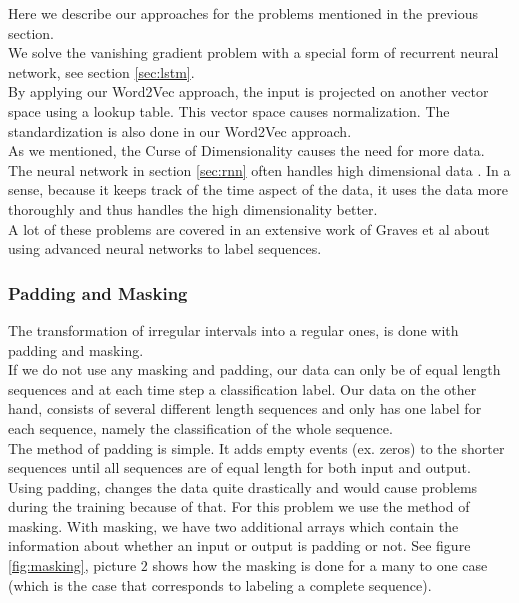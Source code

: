 Here we describe our approaches for the problems mentioned in the previous section. \\
We solve the vanishing gradient problem with a special form of recurrent neural network, see section \ref{sec:lstm}. \\
By applying our Word2Vec approach, the input is projected on another vector space using a lookup table. This vector space causes normalization. The standardization is also done in our Word2Vec approach. \\
As we mentioned, the Curse of Dimensionality causes the need for more data. The neural network in section \ref{sec:rnn} often handles high dimensional data \cite{nn1:article} \cite{nn2:article} \cite{nn3:article} \cite{nn4:article}. In a sense, because it keeps track of the time aspect of the data, it uses the data more thoroughly and thus handles the high dimensionality better. \\

A lot of these problems are covered in an extensive work of Graves et al \cite{gravesLstm:thesis} about using advanced neural networks to label sequences.

\subsubsection{Padding and Masking}
The transformation of irregular intervals into a regular ones, is done with padding and masking. \\

If we do not use any masking and padding, our data can only be of equal length sequences and at each time step a classification label. Our data on the other hand, consists of several different length sequences and only has one label for each sequence, namely the classification of the whole sequence. \\

The method of padding is simple. It adds empty events (ex. zeros) to the shorter sequences until all sequences are of equal length for both input and output. \\
Using padding, changes the data quite drastically and would cause problems during the training because of that. For this problem we use the method of masking. With masking, we have two additional arrays which contain the information about whether an input or output is padding or not. See figure \ref{fig:masking}, picture $2$ shows how the masking is done for a many to one case (which is the case that corresponds to labeling a complete sequence). 

